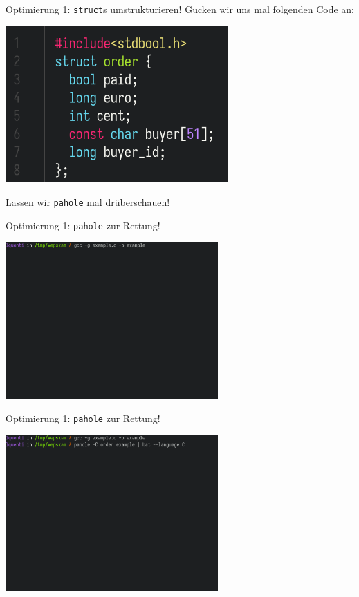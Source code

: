 \documentclass{beamer}
\begin{document}
%
\begin{frame}{Optimierung 1: \texttt{struct}s umstrukturieren!}
Gucken wir uns mal folgenden Code an:
\centerline{\includegraphics[height=6cm]{example1.png}}
\pause
Lassen wir \texttt{pahole} mal dr\"uberschauen!
\end{frame}


\begin{frame}{Optimierung 1: \texttt{pahole} zur Rettung!}
\centerline{\includegraphics[height=6cm]{example2.png}}
\end{frame}

\begin{frame}{Optimierung 1: \texttt{pahole} zur Rettung!}
\centerline{\includegraphics[height=6cm]{example3.png}}
\end{frame}
\end{document}
